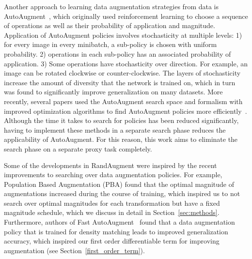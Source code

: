 Another approach to learning data augmentation strategies from data is AutoAugment~\cite{cubuk2018autoaugment}, which originally used reinforcement learning to choose a sequence of operations as well as their probability of application and magnitude. Application of AutoAugment policies involves stochasticity at multiple levels: 1) for every image in every minibatch, a sub-policy is chosen with uniform probability. 2) operations in each sub-policy has an associated probability of application. 3) Some operations have stochasticity over direction. For example, an image can be rotated clockwise or counter-clockwise. The layers of stochasticity increase the amount of diversity that the network is trained on, which in turn was found to significantly improve generalization on many datasets. More recently, several papers used the AutoAugment search space and formalism with improved optimization algorithms to find AutoAugment policies more efficiently~\cite{ho2019population, lim2019fast}. Although the time it takes to search for policies has been reduced significantly, having to implement these methods in a separate search phase reduces the applicability of AutoAugment. For this reason, this work aims to eliminate the search phase on a separate proxy task completely.    

Some of the developments in RandAugment were inspired by the recent improvements to searching over data augmentation policies. For example, Population Based Augmentation (PBA) \cite{ho2019population} found that the optimal magnitude of augmentations increased during the course of training, which inspired us to not search over optimal magnitudes for each transformation but have a fixed magnitude schedule, which we discuss in detail in Section~\ref{sec:methods}. Furthermore, authors of Fast AutoAugment~\cite{lim2019fast} found that a data augmentation policy that is trained for density matching leads to improved generalization accuracy, which inspired our first order differentiable term for improving augmentation (see Section~\ref{first_order_term}). 
